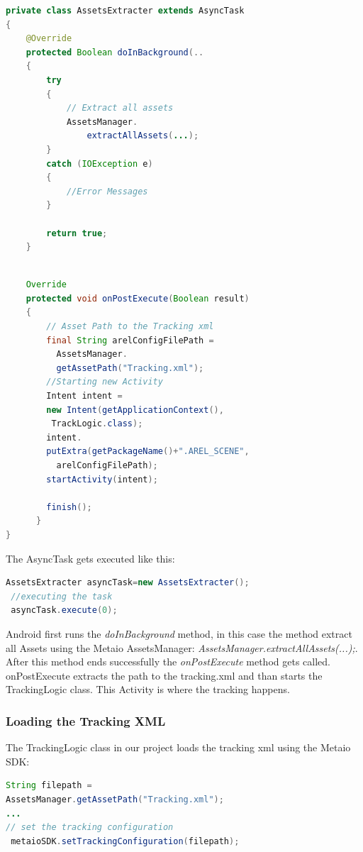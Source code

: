 \begin{lstlisting}[language=java, caption=Extracting Assets 1.,captionpos=b]
private class AssetsExtracter extends AsyncTask
{		
	@Override
	protected Boolean doInBackground(.. 
	{
		try 
		{
			// Extract all assets
			AssetsManager.
				extractAllAssets(...);
		} 
		catch (IOException e) 
		{
			//Error Messages
		}
			
		return true;
	}
\end{lstlisting}
\newpage
\begin{lstlisting}[language=java, caption=Extracting Assets 2.,captionpos=b]
	
	Override
	protected void onPostExecute(Boolean result) 
	{
		// Asset Path to the Tracking xml
		final String arelConfigFilePath = 
		  AssetsManager.
		  getAssetPath("Tracking.xml");
		//Starting new Activity  
		Intent intent = 
		new Intent(getApplicationContext(), 
		 TrackLogic.class);
		intent.
		putExtra(getPackageName()+".AREL_SCENE", 
		  arelConfigFilePath);
		startActivity(intent);

		finish();
	  }
}
\end{lstlisting}
The AsyncTask gets executed like this:

\begin{lstlisting}[language=java, caption=executing AsyncTask,captionpos=b]
 AssetsExtracter asyncTask=new AssetsExtracter();
 //executing the task
 asyncTask.execute(0);
\end{lstlisting}





Android first runs the \textit{doInBackground} method, in this case the method extract all Assets using the Metaio 	AssetsManager: 	\textit{AssetsManager.extractAllAssets(...);}. After this method ends successfully the \textit{onPostExecute} method gets called.
\\


onPostExecute extracts the path to the tracking.xml and than starts the TrackingLogic class. This Activity is where the tracking happens.
\newpage
\subsubsection{Loading the Tracking XML}
The TrackingLogic class in our project loads the tracking xml using the Metaio SDK:
\begin{lstlisting}[language=java, caption=executing AsyncTask,captionpos=b]
String filepath = 
AssetsManager.getAssetPath("Tracking.xml");
...
// set the tracking configuration
 metaioSDK.setTrackingConfiguration(filepath); 
\end{lstlisting}

